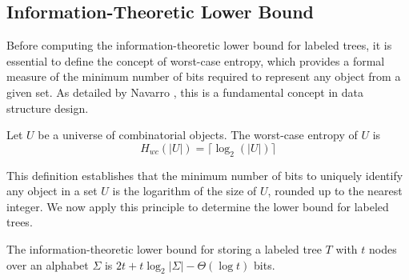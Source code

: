 \begin{comment}
    \section{Succinct Data Structures for Trees}
    \alessio{Questa sezione non è ben collegata al resto. Serve questa parentesi sulle SDS? Dato che anche prima parli di minimizzare lo spazio e time optimality, potresti parlare direttamente dei lower bound. Il filo logico sarebbe: "vogliamo fare le cose il meglio possibile, ma quanto vale il meglio?"}
    In order to compress the index of labeled trees, we need to avoid the use of pointers and store the tree in a space-efficient manner. Succinct data structures are a class of compressed data structures that support efficient navigation and query operations on the compressed data. These structures are designed to use close to the information-theoretic lower bound on space while providing fast access to the original data. They were first introduced by Jacobson \cite{jacobson1989space} and have been applied to various problems in string processing, graph theory, and data compression.
\end{comment}

\subsection{Information-Theoretic Lower Bound}
Before computing the information-theoretic lower bound for labeled trees, it is essential to define the concept of worst-case entropy, which provides a formal measure of the minimum number of bits required to represent any object from a given set. As detailed by Navarro \cite{navarro2016compact}, this is a fundamental concept in data structure design.

\begin{definition}
Let $U$ be a universe of combinatorial objects. The worst-case entropy of $U$ is 
$$ H_{wc}(|U|) = \lceil\log_2(|U|)\rceil $$
\end{definition}

This definition establishes that the minimum number of bits to uniquely identify any object in a set $U$ is the logarithm of the size of $U$, rounded up to the nearest integer. We now apply this principle to determine the lower bound for labeled trees.

\begin{lemma} \label{lem:info_theoretic_lower_bound}
The information-theoretic lower bound for storing a labeled tree $T$ with $t$ nodes over an alphabet $\Sigma$ is $2t + t \log_2 |\Sigma| - \Theta(\log t)$ bits.
\end{lemma}


